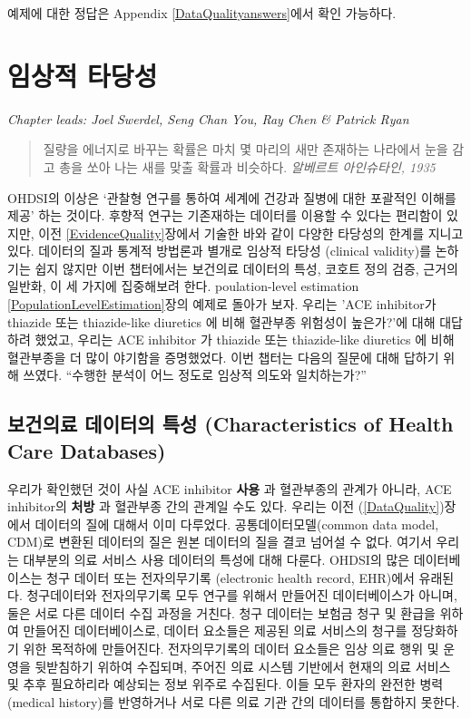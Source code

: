 \documentclass[11pt]{book}
\theoremstyle{definition}
\theoremstyle{definition}
\theoremstyle{definition}
\theoremstyle{remark}
\begin{document}
예제에 대한 정답은 Appendix \ref{DataQualityanswers}에서 확인 가능하다.

\chapter{임상적 타당성}\label{ClinicalValidity}

\emph{Chapter leads: Joel Swerdel, Seng Chan You, Ray Chen \& Patrick
Ryan}

\begin{quote}
질량을 에너지로 바꾸는 확률은 마치 몇 마리의 새만 존재하는 나라에서 눈을
감고 총을 쏘아 나는 새를 맞출 확률과 비슷하다. \emph{알베르트
아인슈타인, 1935}
\end{quote}

OHDSI의 이상은 `관찰형 연구를 통하여 세계에 건강과 질병에 대한 포괄적인
이해를 제공' 하는 것이다. 후향적 연구는 기존재하는 데이터를 이용할 수
있다는 편리함이 있지만, 이전 \ref{EvidenceQuality}장에서 기술한 바와
같이 다양한 타당성의 한계를 지니고 있다. 데이터의 질과 통계적 방법론과
별개로 임상적 타당성 (clinical validity)를 논하기는 쉽지 않지만 이번
챕터에서는 보건의료 데이터의 특성, 코호트 정의 검증, 근거의 일반화, 이
세 가지에 집중해보려 한다. poulation-level estimation
\ref{PopulationLevelEstimation}장의 예제로 돌아가 보자. 우리는 'ACE
inhibitor가 thiazide 또는 thiazide-like diuretics 에 비해 혈관부종
위험성이 높은가?'에 대해 대답하려 했었고, 우리는 ACE inhibitor 가
thiazide 또는 thiazide-like diuretics 에 비해 혈관부종을 더 많이
야기함을 증명했었다. 이번 챕터는 다음의 질문에 대해 답하기 위해 쓰였다.
``수행한 분석이 어느 정도로 임상적 의도와 일치하는가?''

\section{보건의료 데이터의 특성 (Characteristics of Health Care
Databases)}\label{CharacteristicsOfDatabase}

우리가 확인했던 것이 사실 ACE inhibitor \textbf{사용} 과 혈관부종의
관계가 아니라, ACE inhibitor의 \textbf{처방} 과 혈관부종 간의 관계일
수도 있다. 우리는 이전 (\ref{DataQuality})장에서 데이터의 질에 대해서
이미 다루었다. 공통데이터모델(common data model, CDM)로 변환된 데이터의
질은 원본 데이터의 질을 결코 넘어설 수 없다. 여기서 우리는 대부분의 의료
서비스 사용 데이터의 특성에 대해 다룬다. OHDSI의 많은 데이터베이스는
청구 데이터 또는 전자의무기록 (electronic health record, EHR)에서
유래된다. 청구데이터와 전자의무기록 모두 연구를 위해서 만들어진
데이터베이스가 아니며, 둘은 서로 다른 데이터 수집 과정을 거친다. 청구
데이터는 보험금 청구 및 환급을 위하여 만들어진 데이터베이스로, 데이터
요소들은 제공된 의료 서비스의 청구를 정당화하기 위한 목적하에
만들어진다. 전자의무기록의 데이터 요소들은 임상 의료 행위 및 운영을
뒷받침하기 위하여 수집되며, 주어진 의료 시스템 기반에서 현재의 의료
서비스 및 추후 필요하리라 예상되는 정보 위주로 수집된다. 이들 모두
환자의 완전한 병력(medical history)를 반영하거나 서로 다른 의료 기관
간의 데이터를 통합하지 못한다.
\end{document}
